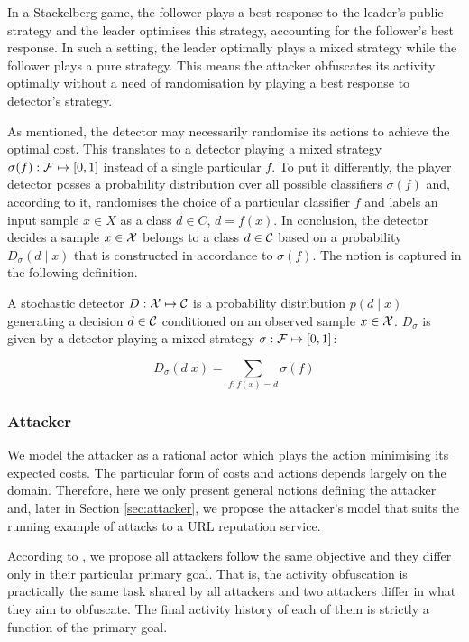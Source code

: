 In a Stackelberg game, the follower plays a best response to the leader's public strategy and the leader optimises this strategy, accounting for the follower's best response. In such a setting, the leader optimally plays a mixed strategy while the follower plays a pure strategy. This means the attacker obfuscates its activity optimally without a need of randomisation by playing a best response to detector's strategy.

As mentioned, the detector may necessarily randomise its actions to achieve the optimal cost. This translates to a detector playing a mixed strategy $\sigma(f) : \mathcal{F} \mapsto [ 0,1 ] $ instead of a single particular $f$. To put it differently, the player detector posses a probability distribution over all possible classifiers $\sigma(f)$ and, according to it, randomises the choice of a particular classifier $f$ and labels an input sample $x \in X$ as a class $d \in C$, $d = f(x)$. In conclusion, the detector decides a sample $x \in \mathcal{X}$ belongs to a class $d \in \mathcal{C}$ based on a probability $D_\sigma(d \mid x)$ that is constructed in accordance to $\sigma(f)$. The notion is captured in the following definition.

\begin{definition}\label{def:stochastic-detector}
    A stochastic detector $D: \mathcal{X} \mapsto \mathcal{C}$ is a probability distribution $p(d \mid x )$ generating a decision $d \in \mathcal{C} $ conditioned on an observed sample $x \in \mathcal{X}$. $D_\sigma$ is given by a detector playing a mixed strategy $\sigma: \mathcal{F} \mapsto [0,1]$:

    \begin{equation*}
        D_\sigma(d|x) = \sum_{f: f(x) = d} \sigma(f)
    \end{equation*}

\end{definition}

\subsubsection{Attacker}\label{sec:attacker-def}
We model the attacker as a rational actor which plays the action minimising its expected costs. The particular form of costs and actions depends largely on the domain. Therefore, here we only present general notions defining the attacker and, later in Section \ref{sec:attacker}, we propose the attacker's model that suits the running example of attacks to a URL reputation service.

According to \cite{stackelberg_games}, we propose all attackers follow the same objective and they differ only in their particular primary goal. That is, the activity obfuscation is practically the same task shared by all attackers and two attackers differ in what they aim to obfuscate. The final activity history of each of them is strictly a function of the primary goal.

